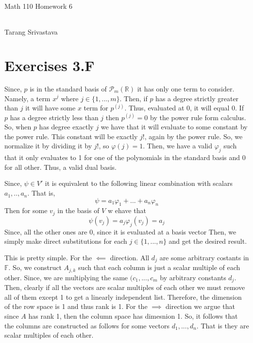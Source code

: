 \documentclass[10pt, twocolumn]{article}
\author{Tarang Srivastava}
\newcommand{\R}{\mathbb{R}}
\newcommand{\F}{\mathbb{F}}
\newcommand{\poly}[2]{\mathcal{P}_{#1}\left(#2\right)}
\newcommand{\makechaptertitle}[1]{
\begin{center}
	\begin{large}
		#1
	\end{large}
	\begin{small}
		\\Tarang Srivastava
	\end{small}
\end{center}
}
\begin{document}
	
\makechaptertitle{Math 110 Homework 6}

\section{Exercises 3.F}
\begin{q}[7]
    Since, $ p $ is in the standard basis of $ \poly{m}{\R} $ it has only one term to consider.
    Namely, a term $ x^j $ where $ j \in \{1, ..., m\} $. 
    Then, if $ p $ has a degree strictly greater than $ j $ it will have some $ x $ term for $ p^(j) $. 
    Thus, evaluated at 0, it will equal 0. 
    If $ p $ has a degree strictly less than $ j $ then $ p^{(j)} = 0 $ by the power rule form calculus.
    So, when $ p $ has degree exactly $ j $ we have that it will evaluate to some constant by the power rule. 
    This constant will be exactly $ j! $, again by the power rule. 
    So, we normalize it by dividing it by $ j! $, so $ \varphi(j) = 1$. 
    Then, we have a valid $ \varphi_j $ such that it only evaluates to 1 for one of the polynomials in the standard basis and 0 for all other. 
    Thus, a valid dual basis. 
\end{q}
\begin{q}[9]
    Since, $ \psi \in V' $ it is equivalent to the following linear combination with scalars $ a_1, .., a_n $. 
    That is, 
    $$ \psi = a_1 \varphi_1 + ... + a_n \varphi_n $$
    Then for some $ v_j $ in the basis of $ V $ w ehave that 
    $$ \psi(v_j) = a_j \varphi_j(v_j) = a_j $$
    Since, all the other ones are 0, since it is evaluated at a basis vector
    Then, we simply make direct substitutions for each $ j \in \{1, ..., n\} $ and get the desired result.
\end{q}
\begin{q}[11]
    This is pretty simple. 
    For the $ \impliedby $ direction. 
    All $ d_j $ are some arbitrary costants in $ \F $. 
    So, we construct $ A_{j, k} $ such that each column is just a scalar multiple of each other. 
    Since, we are multiplying the same $ (c_1, ..., c_m $ by arbitrary constants $ d_j $. 
    Then, clearly if all the vectors are scalar multiples of each other we must remove all of them except 1 to get a linearly independent list. 
    Therefore, the dimension of the row space is 1 and thus rank is 1. 
    For the $ \implies $ direction we argue that since $ A $ has rank 1, then the column space has dimesnion 1. 
    So, it follows that the columns are constructed as follows for some vectors $ d_1, ..., d_n $. That is they are scalar multiples of each other.
\end{q}
\end{document}

